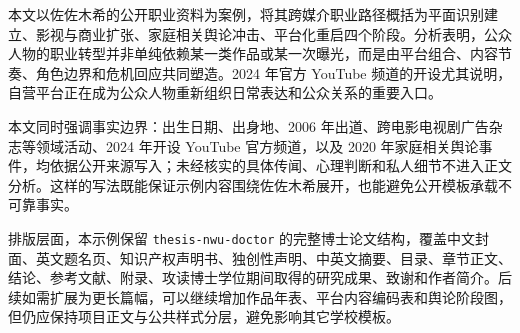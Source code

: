 本文以佐佐木希的公开职业资料为案例，将其跨媒介职业路径概括为平面识别建立、影视与商业扩张、家庭相关舆论冲击、平台化重启四个阶段。分析表明，公众人物的职业转型并非单纯依赖某一类作品或某一次曝光，而是由平台组合、内容节奏、角色边界和危机回应共同塑造。2024 年官方 YouTube 频道的开设尤其说明，自营平台正在成为公众人物重新组织日常表达和公众关系的重要入口。

本文同时强调事实边界：出生日期、出身地、2006 年出道、跨电影电视剧广告杂志等领域活动、2024 年开设 YouTube 官方频道，以及 2020 年家庭相关舆论事件，均依据公开来源写入；未经核实的具体传闻、心理判断和私人细节不进入正文分析。这样的写法既能保证示例内容围绕佐佐木希展开，也能避免公开模板承载不可靠事实。

排版层面，本示例保留 \texttt{thesis-nwu-doctor} 的完整博士论文结构，覆盖中文封面、英文题名页、知识产权声明书、独创性声明、中英文摘要、目录、章节正文、结论、参考文献、附录、攻读博士学位期间取得的研究成果、致谢和作者简介。后续如需扩展为更长篇幅，可以继续增加作品年表、平台内容编码表和舆论阶段图，但仍应保持项目正文与公共样式分层，避免影响其它学校模板。
